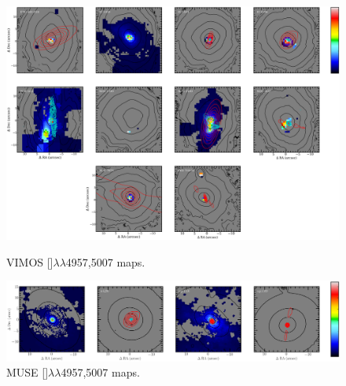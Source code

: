 		\begin{figure}
			\centering
			\includegraphics[width=\textwidth]{chapter5/vimos/Hb.png}
			\caption[VIMOS  maps]{VIMOS []$\lambda\lambda$4957,5007 maps.\label{fig:VIMOS_OIII}} 
			
			\vspace{\floatsep}
			\includegraphics[width=\textwidth]{chapter5/muse/Hb.png}
			\caption[MUSE  maps]{MUSE []$\lambda\lambda$4957,5007 maps.\label{fig:MUSE_OIII}} 
			
		\end{figure}


		




